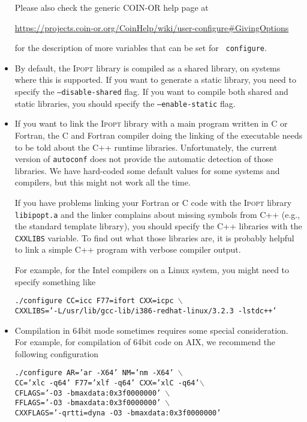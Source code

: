 \documentclass[10pt]{article}
\newcommand{\Ipopt}{\textsc{Ipopt}\xspace}
\begin{document}
\begin{itemize}
  Please also check the generic COIN-OR help page at

  \centerline{\url{https://projects.coin-or.org/CoinHelp/wiki/user-configure\#GivingOptions}}

  for the description of more variables that can be set for {\tt
    configure}.

\item By default, the \Ipopt library is compiled as a shared library,
  on systems where this is supported.  If you want to generate a
  static library, you need to specify the {\tt --disable-shared}
  flag.  If you want to compile both shared and static libraries, you
  should specify the {\tt --enable-static} flag.

\item If you want to link the \Ipopt library with a main program
  written in C or Fortran, the C and Fortran compiler doing the
  linking of the executable needs to be told about the C++ runtime
  libraries.  Unfortunately, the current version of {\tt autoconf}
  does not provide the automatic detection of those libraries.  We
  have hard-coded some default values for some systems and compilers,
  but this might not work all the time.

  If you have problems linking your Fortran or C code with the \Ipopt
  library {\tt libipopt.a} and the linker complains about missing
  symbols from C++ (e.g., the standard template library), you should
  specify the C++ libraries with the {\tt CXXLIBS} variable.  To find out
  what those libraries are, it is probably helpful to link a  simple C++
  program with verbose compiler output.

  For example, for the Intel compilers on a Linux system, you
  might need to specify something like

  {\tt ./configure CC=icc F77=ifort CXX=icpc $\backslash$\\ \hspace*{14ex} CXXLIBS='-L/usr/lib/gcc-lib/i386-redhat-linux/3.2.3 -lstdc++'}

\item Compilation in 64bit mode sometimes requires some special
  consideration.  For example, for compilation of 64bit code on AIX,
  we recommend the following configuration

  {\tt ./configure AR='ar -X64' NM='nm -X64' $\backslash$\\
    \hspace*{14ex} CC='xlc -q64' F77='xlf -q64' CXX='xlC
    -q64'$\backslash$\\ \hspace*{14ex} CFLAGS='-O3
    -bmaxdata:0x3f0000000'
    $\backslash$\\ \hspace*{14ex} FFLAGS='-O3 -bmaxdata:0x3f0000000' $\backslash$\\
    \hspace*{14ex} CXXFLAGS='-qrtti=dyna -O3 -bmaxdata:0x3f0000000'}


\end{itemize}
\end{document}
